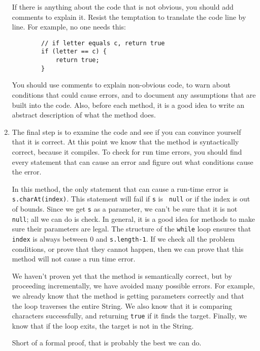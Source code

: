 \documentclass{book}
\begin{document}
\begin{enumerate}
If there is anything about the code that is not obvious, you
should add comments to explain it.  Resist the temptation to
translate the code line by line.  For example, no one needs this:

\begin{verbatim}
        // if letter equals c, return true
        if (letter == c) {
            return true;
        }
\end{verbatim}

You should use comments to explain non-obvious code, to warn
about conditions that could cause errors, and to document any
assumptions that are built into the code.  Also, before each
method, it is a good idea to write an abstract description of
what the method does.


\item The final step is to examine the code and see if you
can convince yourself that it is correct.  
At this point we know that the method is syntactically correct,
because it compiles.
To check for run time errors, you should find every statement
that can cause an error and figure out what conditions cause
the error.

In this method, the only statement that can cause a run-time error is
{\tt s.charAt(index)}.  This statement will fail if {\tt s} is {\tt
null} or if the index is out of bounds.  Since we get {\tt s} as a
parameter, we can't be sure that it is not {\tt null}; all we can do
is check.  In general, it is a good idea for methods to make sure
their parameters are legal.  The structure of the {\tt while} loop
ensures that {\tt index} is always between 0 and {\tt s.length-1}.  If
we check all the problem conditions, or prove that they cannot happen,
then we can prove that this method will not cause a run time error.

We haven't proven yet that the method is semantically correct, but by
proceeding incrementally, we have avoided many possible errors.  For
example, we already know that the method is getting parameters
correctly and that the loop traverses the entire String.  We also know
that it is comparing characters successfully, and returning {\tt true} if
it finds the target.  Finally, we know that if the loop exits,
the target is not in the String.

Short of a formal proof, that is probably the best we can do.

\end{enumerate}
\end{document}
